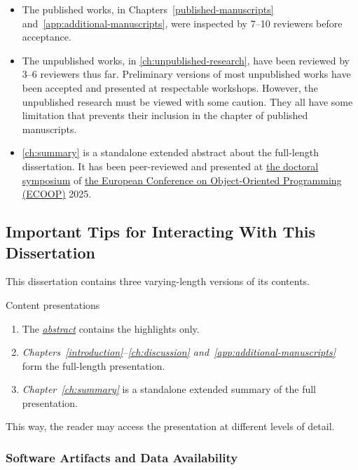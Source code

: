 \begin{itemize}

\item The published works, in Chapters~\ref{published-manuscripts} and~\ref{app:additional-manuscripts}, were inspected by 7--10 reviewers before acceptance.

\item The unpublished works, in \autoref{ch:unpublished-research}, have been reviewed by 3--6 reviewers thus far.
Preliminary versions of most unpublished works have been accepted and presented at respectable workshops.
However, the unpublished research must be viewed with some caution.
They all have some limitation that prevents their inclusion in the chapter of published manuscripts.

\item \autoref{ch:summary} is a standalone extended abstract about the full-length dissertation.
It has been peer-reviewed and presented at \href{https://2025.ecoop.org/track/ecoop-2025-doctoral-symposium}{the doctoral symposium} of \href{https://2025.ecoop.org}{the European Conference on Object-Oriented Programming (ECOOP)} 2025.

\end{itemize}

\subsection{Important Tips for Interacting With This Dissertation}
\label{subsec:tips}

This dissertation contains three varying-length versions of its contents.

\begin{infobox}[]{Content presentations}
\begin{enumerate}[wide, labelwidth=!, labelindent=0pt]
\item The \emph{\hyperref[abs]{abstract}} contains the highlights only.
\item \emph{Chapters~\ref{introduction}--\ref{ch:discussion}
and~\ref{app:additional-manuscripts}} form the full-length presentation.
\item \emph{Chapter~\ref{ch:summary}} is a standalone extended summary of the
full presentation.
\end{enumerate}
\end{infobox}

This way, the reader may access the presentation at different levels of detail.

\subsubsection{Software Artifacts and Data Availability}

